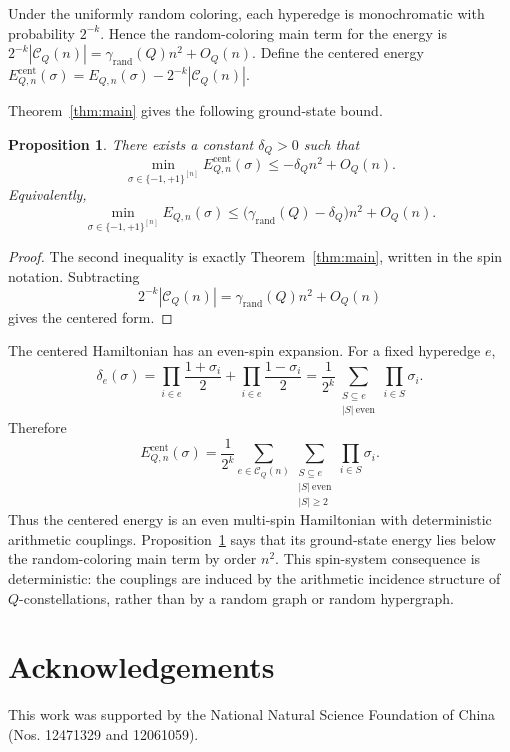 \documentclass[twoside,12pt]{article}
\newcommand{\rand}{\mathrm{rand}}
\newcommand{\1}{\mathbf 1}
\newtheorem{proposition}{Proposition}[section]
\begin{document}
Under the uniformly random coloring, each hyperedge is monochromatic with
probability \(2^{-k}\).  Hence the random-coloring main term for the energy is
$2^{-k}|\mathcal C_Q(n)|
=
\gamma_{\rand}(Q)n^2+O_Q(n)$.
Define the centered energy
$E_{Q,n}^{\mathrm{cent}}(\sigma)
=
E_{Q,n}(\sigma)-2^{-k}|\mathcal C_Q(n)|$.

Theorem~\ref{thm:main} gives the following ground-state bound.

\begin{proposition}\label{prop:spin-ground-state}
There exists a constant \(\delta_Q>0\) such that
\[
\min_{\sigma\in\{-1,+1\}^{[n]}}
E_{Q,n}^{\mathrm{cent}}(\sigma)
\le
-\delta_Q n^2+O_Q(n).
\]
Equivalently,
\[
\min_{\sigma\in\{-1,+1\}^{[n]}}E_{Q,n}(\sigma)
\le
\bigl(\gamma_{\rand}(Q)-\delta_Q\bigr)n^2+O_Q(n).
\]
\end{proposition}

\begin{proof}
The second inequality is exactly Theorem~\ref{thm:main}, written in the spin
notation.  Subtracting
\[
2^{-k}|\mathcal C_Q(n)|=\gamma_{\rand}(Q)n^2+O_Q(n)
\]
gives the centered form.
\end{proof}

The centered Hamiltonian has an even-spin expansion.  For a fixed hyperedge
\(e\),
\[
\delta_e(\sigma)
=
\prod_{i\in e}\frac{1+\sigma_i}{2}
+
\prod_{i\in e}\frac{1-\sigma_i}{2}
=
\frac{1}{2^k}
\sum_{\substack{S\subseteq e\\ |S|\ \mathrm{even}}}
\prod_{i\in S}\sigma_i.
\]
Therefore
\[
E_{Q,n}^{\mathrm{cent}}(\sigma)
=
\frac{1}{2^k}
\sum_{e\in\mathcal C_Q(n)}
\sum_{\substack{S\subseteq e\\ |S|\ \mathrm{even}\\ |S|\ge2}}
\prod_{i\in S}\sigma_i.
\]
Thus the centered energy is an even multi-spin Hamiltonian with deterministic
arithmetic couplings.  Proposition~\ref{prop:spin-ground-state} says that its
ground-state energy lies below the random-coloring main term by order \(n^2\).
This spin-system consequence is deterministic: the couplings are induced by the
arithmetic incidence structure of \(Q\)-constellations, rather than by a random
graph or random hypergraph.

\section*{Acknowledgements}
This work was supported by the National Natural Science Foundation of China
(Nos. 12471329 and 12061059).
\end{document}
